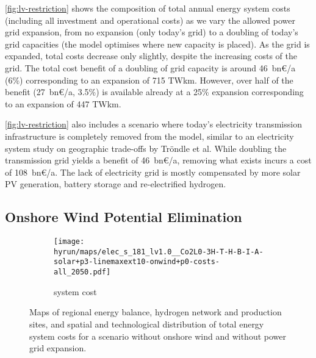 \cref{fig:lv-restriction} shows the composition of total annual energy system costs
(including all investment and operational costs) as we vary the allowed power
grid expansion, from no expansion (only today's grid) to a doubling of today's
grid capacities (the model optimises where new capacity is placed). As the grid
is expanded, total costs decrease only slightly, despite the increasing costs of
the grid. The total cost benefit of a doubling of grid capacity is around
46~bn\euro/a (6\%) corresponding to an expansion of 715 TWkm. However, over half
of the benefit (27~bn\euro/a, 3.5\%) is available already at a 25\% expansion
corresponding to an expansion of 447 TWkm.

\cref{fig:lv-restriction} also includes a scenario where today's electricity
transmission infrastructure is completely removed from the model, similar to an
electricity system study on geographic trade-offs by Tröndle et
al. While doubling the transmission grid
yields a benefit of 46~bn\euro/a, removing what exists incurs a cost of
108~bn\euro/a. The lack of electricity grid is mostly compensated by more solar
PV generation, battery storage and re-electrified hydrogen.

\subsection{Onshore Wind Potential Elimination}
\label{sec:si:onw}

\begin{figure}
    \centering
    \begin{subfigure}[t]{0.6\textwidth}
        \centering
        \caption{system cost}
        \texttt{[image: \\hyrun/maps/elec\_s\_181\_lv1.0\_\_Co2L0-3H-T-H-B-I-A-solar+p3-linemaxext10-onwind+p0-costs-all\_2050.pdf]}
        \label{fig:no-onw:tsc}
    \end{subfigure}
    \caption{Maps of regional energy balance, hydrogen network and production sites, and spatial and technological distribution of total energy system costs for a scenario without onshore wind and without power grid expansion.}
    \label{fig:no-onw}
\end{figure}

